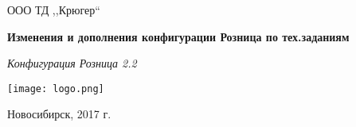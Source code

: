 \begin{titlepage}
\begin{center}
\large
ООО ТД ,,Крюгер``

%
\vspace{2.25cm}

	\textbf{Изменения и дополнения конфигурации Розница по тех.заданиям} 

\textit{Конфигурация Розница 2.2}
\vfill    

{\texttt{[image: logo.png]}}  

\end{center}
\vfill

\newlength{\ML}

\begin{center}
Новосибирск, 2017 г.
\end{center}
\end{titlepage}